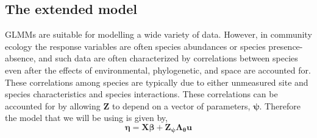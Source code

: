 \documentclass{article}
\begin{document}
\subsection{The extended model}

GLMMs are suitable for modelling a wide variety of data.  However, in
community ecology the response variables are often species abundances
or species presence-absence, and such data are often characterized by
correlations between species even after the effects of environmental,
phylogenetic, and space are accounted for.  These correlations among
species are typically due to either unmeasured site and species
characteristics and species interactions.  These correlations can be
accounted for by allowing $\bm Z$ to depend on a vector of parameters,
$\bm\psi$.  Therefore the model that we will be using is given by,
\begin{equation}
  \label{eq:6}
  \bm\eta = \bm X\bm\beta + \bm Z_{\bm\psi}\bm\Lambda_{\bm\theta}\bm u
\end{equation}
\end{document}
